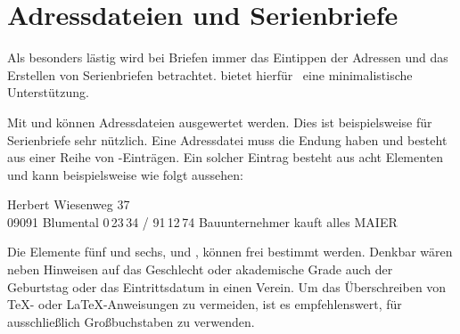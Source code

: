 \section{Adressdateien und Serienbriefe}
%
\BeginIndexGroup
{}%

Als besonders lästig wird bei Briefen immer das Eintippen der Adressen und das
Erstellen von Serienbriefen betrachtet. \KOMAScript{} bietet
hierfür%
%
\ eine minimalistische Unterstützung.%

\begin{Declaration}
\end{Declaration}
Mit  und  können
Adressdateien ausgewertet werden. Dies ist
beispielsweise für Serienbriefe sehr nützlich. Eine Adressdatei muss
die Endung  haben und besteht aus einer Reihe von
-Einträgen. Ein solcher Eintrag besteht aus acht
Elementen und kann beispielsweise wie folgt aussehen:
\begin{lstcode}
           {Herbert}
           {Wiesenweg 37\\ 09091 Blumental}
           {0\,23\,34 / 91\,12\,74}
           {Bauunternehmer}
           {}
           {kauft alles}
           {MAIER}
\end{lstcode}
Die Elemente fünf und sechs,  und , können frei
bestimmt werden. Denkbar wären neben Hinweisen auf das Geschlecht oder
akademische Grade auch der Geburtstag oder das Eintrittsdatum in einen
Verein.  Um das Überschreiben von \TeX- oder \LaTeX-Anweisungen zu
vermeiden, ist es empfehlenswert, für  ausschließlich
Großbuchstaben zu verwenden.

